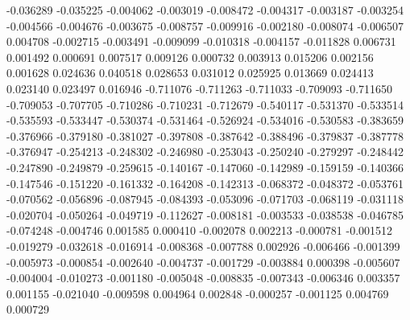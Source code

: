-0.036289
-0.035225
-0.004062
-0.003019
-0.008472
-0.004317
-0.003187
-0.003254
-0.004566
-0.004676
-0.003675
-0.008757
-0.009916
-0.002180
-0.008074
-0.006507
0.004708
-0.002715
-0.003491
-0.009099
-0.010318
-0.004157
-0.011828
0.006731
0.001492
0.000691
0.007517
0.009126
0.000732
0.003913
0.015206
0.002156
0.001628
0.024636
0.040518
0.028653
0.031012
0.025925
0.013669
0.024413
0.023140
0.023497
0.016946
-0.711076
-0.711263
-0.711033
-0.709093
-0.711650
-0.709053
-0.707705
-0.710286
-0.710231
-0.712679
-0.540117
-0.531370
-0.533514
-0.535593
-0.533447
-0.530374
-0.531464
-0.526924
-0.534016
-0.530583
-0.383659
-0.376966
-0.379180
-0.381027
-0.397808
-0.387642
-0.388496
-0.379837
-0.387778
-0.376947
-0.254213
-0.248302
-0.246980
-0.253043
-0.250240
-0.279297
-0.248442
-0.247890
-0.249879
-0.259615
-0.140167
-0.147060
-0.142989
-0.159159
-0.140366
-0.147546
-0.151220
-0.161332
-0.164208
-0.142313
-0.068372
-0.048372
-0.053761
-0.070562
-0.056896
-0.087945
-0.084393
-0.053096
-0.071703
-0.068119
-0.031118
-0.020704
-0.050264
-0.049719
-0.112627
-0.008181
-0.003533
-0.038538
-0.046785
-0.074248
-0.004746
0.001585
0.000410
-0.002078
0.002213
-0.000781
-0.001512
-0.019279
-0.032618
-0.016914
-0.008368
-0.007788
0.002926
-0.006466
-0.001399
-0.005973
-0.000854
-0.002640
-0.004737
-0.001729
-0.003884
0.000398
-0.005607
-0.004004
-0.010273
-0.001180
-0.005048
-0.008835
-0.007343
-0.006346
0.003357
0.001155
-0.021040
-0.009598
0.004964
0.002848
-0.000257
-0.001125
0.004769
0.000729
